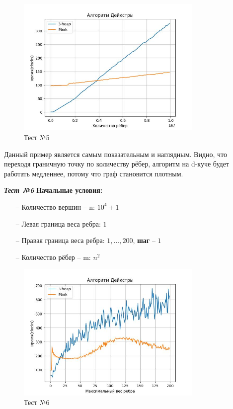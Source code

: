 \begin{text}
\begin{center}
\end{center}
\begin{figure}[h]
  \centering
  \includegraphics[width=0.8\textwidth]{pictures/5.jpeg}
  \caption{Тест №5}
  \label{fig:pict_5}
\end{figure}

Данный пример является самым показательным и наглядным. Видно, что переходя граничную точку по количеству рёбер, алгоритм на d-куче будет работать медленнее, потому что граф становится плотным.\\
\newpage

\begin{center}
\textbf{\textit{Тест №6}}
\textbf{Начальные условия:}

\begin{enumerate}
	\item[--] Количество вершин -- n: $10^4 + 1$
	\item[--] Левая граница веса ребра: $1$
	\item[--] Правая граница веса ребра: $1,...,200$, \textbf{шаг} -- $1$
	\item[--] Количество рёбер -- m: $n^2$
\end{enumerate}

\end{center}
\begin{figure}[h]
  \centering
  \includegraphics[width=0.8\textwidth]{pictures/6.jpeg}
  \caption{Тест №6}
  \label{fig:pict_6}
\end{figure}


\end{text}
